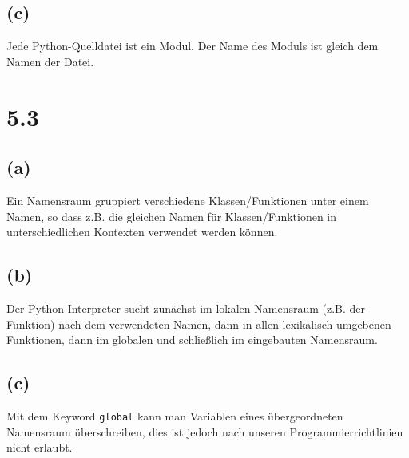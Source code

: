 \subsection*{(c)}
Jede Python-Quelldatei ist ein Modul. Der Name des Moduls ist gleich dem Namen der Datei.

\section*{5.3}
\subsection*{(a)}
Ein Namensraum gruppiert verschiedene Klassen/Funktionen unter einem Namen, so dass z.B. die gleichen Namen für Klassen/Funktionen in unterschiedlichen Kontexten verwendet werden können.

\subsection*{(b)}
Der Python-Interpreter sucht zunächst im lokalen Namensraum (z.B. der Funktion) nach dem verwendeten Namen, dann in allen lexikalisch umgebenen Funktionen, dann im globalen und schließlich im eingebauten Namensraum. \cite{skript}

\subsection*{(c)}
Mit dem Keyword \verb+global+ kann man Variablen eines übergeordneten Namensraum überschreiben, dies ist jedoch nach unseren Programmierrichtlinien nicht erlaubt. \cite{skript}